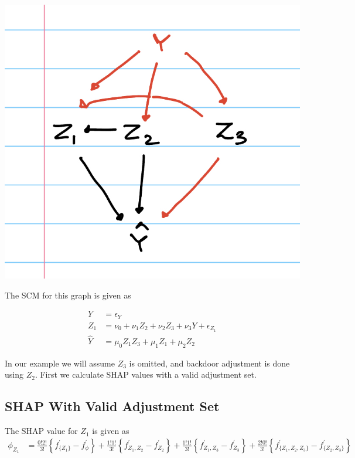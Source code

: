 \documentclass{article}
\begin{document}
\begin{center}
\includegraphics[scale = 0.2]{Do-SHAP_Counterexample.jpeg}
\end{center}

The SCM for this graph is given as 

\begin{align*}
Y &= \epsilon_Y\\
Z_1 &= \nu_0 + \nu_{1}Z_2 + \nu_{2} Z_3 + \nu_{3} Y + \epsilon_{Z_1}\\
\hat{Y} &= \mu_0Z{_1}Z{_3} + \mu_1Z_1 + \mu_2Z_2 
\end{align*}

In our example we will assume $Z_3$ is omitted, and backdoor adjustment is done using $Z_2$. First we calculate SHAP values with a valid adjustment set.
\subsection{SHAP With Valid Adjustment Set}

The SHAP value for $Z_1$ is given as 
\begin{align*}
\phi_{Z_1} &= \frac{0!2!}{3!}\left\{f^\prime_{\{Z_1\}} - f^\prime_{\phi} \right\} + \frac{1!1!}{3!}\left\{f^\prime_{Z_1, Z_2} - f^\prime_{Z_2} \right\} + \frac{1!1!}{3!}\left\{f^\prime_{Z_1, Z_3} - f^\prime_{Z_3} \right\} + \frac{2!0!}{3!}\left\{f^\prime_{\{Z_1, Z_2, Z_3 \}} - f^\prime_{\{Z_2, Z_3 \}}\right\}
\end{align*}
\end{document}
